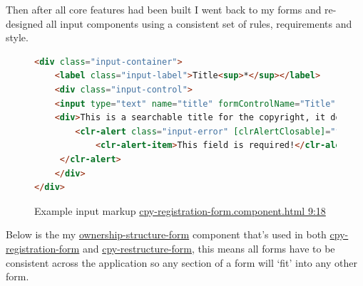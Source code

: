 Then after all core features had been built I went back to my forms and re-designed all input components using a consistent set of rules, requirements and style.    

\begin{figure}[H]
\caption{Example input markup \href{https://github.com/MrHarrisonBarker/CRPL/blob/main/CRPL.Web/ClientApp/src/app/Forms/cpy-registration-form/cpy-registration-form.component.html}{cpy-registration-form.component.html 9:18}}
\centering
\begin{lstlisting}[language=html]
<div class="input-container">
	<label class="input-label">Title<sup>*</sup></label>
	<div class="input-control">
	<input type="text" name="title" formControlName="Title" placeholder="Hello world"/>
	<div>This is a searchable title for the copyright, it doesn't have to be unique only descriptive and relevant&nbsp;<sup>*saved to the blockchain</sup></div>
		<clr-alert class="input-error" [clrAlertClosable]="false" clrAlertType="danger" *ngIf="InvalidAndUntouched('Title')">
		 	<clr-alert-item>This field is required!</clr-alert-item>
	 </clr-alert>
	</div>
</div>
\end{lstlisting}
\end{figure}

Below is the my \href{https://github.com/MrHarrisonBarker/CRPL/tree/main/CRPL.Web/ClientApp/src/app/Forms/ownership-structure-form}{ownership-structure-form} component that's used in both \href{https://github.com/MrHarrisonBarker/CRPL/tree/main/CRPL.Web/ClientApp/src/app/Forms/cpy-registration-form}{cpy-registration-form} and \href{https://github.com/MrHarrisonBarker/CRPL/tree/main/CRPL.Web/ClientApp/src/app/Forms/cpy-restructure-form}{cpy-restructure-form}, this means all forms have to be consistent across the application so any section of a form will `fit' into any other form.

